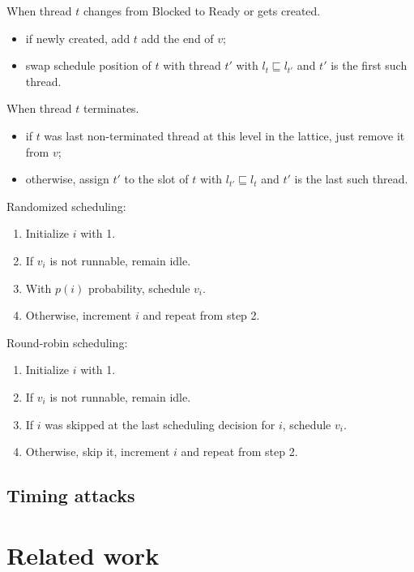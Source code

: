 \documentclass[10pt,preprint]{sigplanconf}
\begin{document}
When thread $t$ changes from Blocked to Ready or gets created.

\begin{itemize}
  \item if newly created, add $t$ add the end of $v$;
  \item swap schedule position of $t$ with thread $t'$ with $l_{t} \sqsubseteq l_{t'}$ and $t'$ is the first such thread.
\end{itemize}

When thread $t$ terminates.

\begin{itemize}
  \item if $t$ was last non-terminated thread at this level in the lattice, just remove it from $v$;
  \item otherwise, assign $t'$ to the slot of $t$ with $l_{t'} \sqsubseteq l_t$ and $t'$ is the last such thread.
\end{itemize}

Randomized scheduling:

\begin{enumerate}
  \item Initialize $i$ with 1.
  \item If $v_i$ is not runnable, remain idle.
  \item With $p(i)$ probability, schedule $v_i$.
  \item Otherwise, increment $i$ and repeat from step 2.
\end{enumerate}

Round-robin scheduling:

\begin{enumerate}
  \item Initialize $i$ with 1.
  \item If $v_i$ is not runnable, remain idle.
  \item If $i$ was skipped at the last scheduling decision for $i$, schedule $v_i$.
  \item Otherwise, skip it, increment $i$ and repeat from step 2.
\end{enumerate}

\subsection{Timing attacks}



\section{Related work}
\end{document}
